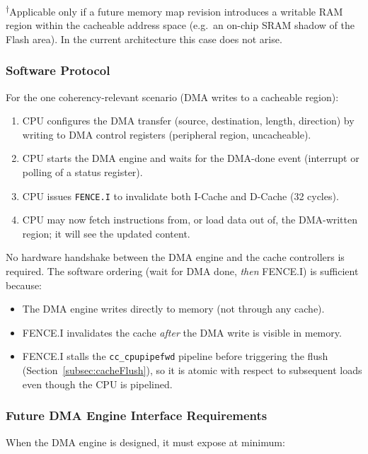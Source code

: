 \textsuperscript{$\dagger$}Applicable only if a future memory map revision
introduces a writable RAM region within the cacheable address space
(e.g.\ an on-chip SRAM shadow of the Flash area).
In the current architecture this case does not arise.

\subsubsection{Software Protocol}

For the one coherency-relevant scenario (DMA writes to a cacheable region):

\begin{enumerate}
  \item CPU configures the DMA transfer (source, destination, length,
    direction) by writing to DMA control registers (peripheral region,
    uncacheable).
  \item CPU starts the DMA engine and waits for the DMA-done event
    (interrupt or polling of a status register).
  \item CPU issues \texttt{FENCE.I} to invalidate both I-Cache and
    D-Cache (32 cycles).
  \item CPU may now fetch instructions from, or load data out of,
    the DMA-written region; it will see the updated content.
\end{enumerate}

No hardware handshake between the DMA engine and the cache controllers
is required.
The software ordering (wait for DMA done, \emph{then} FENCE.I) is
sufficient because:

\begin{itemize}
  \item The DMA engine writes directly to memory (not through any cache).
  \item FENCE.I invalidates the cache \emph{after} the DMA write is
    visible in memory.
  \item FENCE.I stalls the \texttt{cc\_cpupipefwd} pipeline before
    triggering the flush (Section~\ref{subsec:cacheFlush}), so it is
    atomic with respect to subsequent loads even though the CPU is
    pipelined.
\end{itemize}

\subsubsection{Future DMA Engine Interface Requirements}

When the DMA engine is designed, it must expose at minimum:


